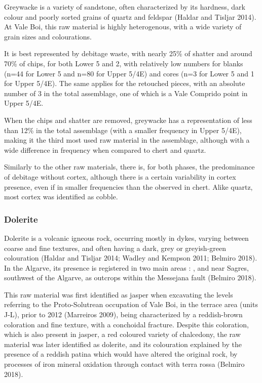 \documentclass[12pt,twoside]{reedthesis}
\begin{document}
Greywacke is a variety of sandstone, often characterized by its hardness, dark colour and poorly sorted grains of quartz and feldspar (Haldar and Tisljar 2014). At Vale Boi, this raw material is highly heterogenous, with a wide variety of grain sizes and colourations.

It is best represented by debitage waste, with nearly 25\% of shatter and around 70\% of chips, for both Lower 5 and 2, with relatively low numbers for blanks (n=44 for Lower 5 and n=80 for Upper 5/4E) and cores (n=3 for Lower 5 and 1 for Upper 5/4E). The same applies for the retouched pieces, with an absolute number of 3 in the total assemblage, one of which is a Vale Comprido point in Upper 5/4E.

When the chips and shatter are removed, greywacke has a representation of less than 12\% in the total assemblage (with a smaller frequency in Upper 5/4E), making it the third most used raw material in the assemblage, although with a wide difference in frequency when compared to chert and quartz.

Similarly to the other raw materials, there is, for both phases, the predominance of debitage without cortex, although there is a certain variability in cortex presence, even if in smaller frequencies than the observed in chert. Alike quartz, most cortex was identified as cobble.

\hypertarget{dolerite}{%
\subsubsection{Dolerite}\label{dolerite}}

Dolerite is a volcanic igneous rock, occurring mostly in dykes, varying between coarse and fine textures, and often having a dark, grey or greyish-green colouration (Haldar and Tisljar 2014; Wadley and Kempson 2011; Belmiro 2018). In the Algarve, its presence is registered in two main areas : , and near Sagres, southwest of the Algarve, as outcrops within the Messejana fault (Belmiro 2018).

This raw material was first identified as jasper when excavating the levels referring to the Proto-Solutrean occupation of Vale Boi, in the terrace area (units J-L), prior to 2012 (Marreiros 2009), being characterized by a reddish-brown coloration and fine texture, with a conchoidal fracture. Despite this coloration, which is also present in jasper, a red coloured variety of chalcedony, the raw material was later identified as dolerite, and its colouration explained by the presence of a reddish patina which would have altered the original rock, by processes of iron mineral oxidation through contact with terra rossa (Belmiro 2018).
\end{document}
